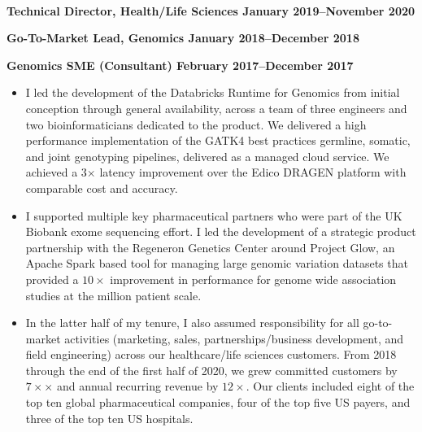 \documentclass[10pt]{article} %
\begin{document}
\begin {minipage}[t]{0.8\linewidth}
 \\
\centerline {{\bf Technical Director, Health/Life Sciences \hfill January 2019--November 2020}}
\centerline {{\bf Go-To-Market Lead, Genomics \hfill January 2018--December 2018}}
\centerline {{\bf Genomics SME (Consultant) \hfill February 2017--December 2017}}
\begin{itemize}
\item {I led the development of the Databricks Runtime for Genomics from initial conception through general availability, across a team of three engineers and two bioinformaticians dedicated to the product. We delivered a high performance implementation of the GATK4 best practices germline, somatic, and joint genotyping pipelines, delivered as a managed cloud service. We achieved a 3$\times$ latency improvement over the Edico DRAGEN platform with comparable cost and accuracy.}
\item {I supported multiple key pharmaceutical partners who were part of the UK Biobank exome sequencing effort. I led the development of a
strategic product partnership with the Regeneron Genetics Center around Project Glow, an Apache Spark based tool for managing large genomic variation datasets that provided a $10\times$ improvement in
performance for genome wide association studies at the million patient scale.}
\item {In the latter half of my tenure, I also assumed responsibility for all go-to-market activities (marketing, sales, partnerships/business development, and
field engineering) across our healthcare/life sciences customers. From 2018 through the end of the first half of 2020, we grew
committed customers by $7\times×$ and annual recurring revenue by $12\times$. Our clients
included eight of the top ten global pharmaceutical companies, four of the top five
US payers, and three of the top ten US hospitals.}
\end{itemize}

\end {minipage}
\end{document}
